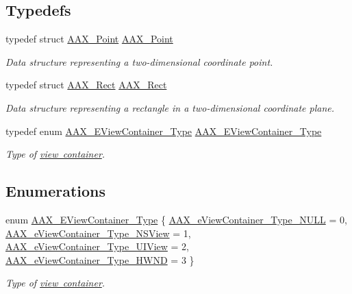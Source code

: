 \subsection*{Typedefs}
\begin{DoxyCompactItemize}
\item 
typedef struct \mbox{\hyperlink{a01609}{A\+A\+X\+\_\+\+Point}} \mbox{\hyperlink{a00503_aace06b5ca898ac66c68fe5f5c598f0b6}{A\+A\+X\+\_\+\+Point}}
\begin{DoxyCompactList}\small\item\em Data structure representing a two-\/dimensional coordinate point. \end{DoxyCompactList}\item 
typedef struct \mbox{\hyperlink{a01613}{A\+A\+X\+\_\+\+Rect}} \mbox{\hyperlink{a00503_a85ca9d563f37484d29b66a2e4ec6598f}{A\+A\+X\+\_\+\+Rect}}
\begin{DoxyCompactList}\small\item\em Data structure representing a rectangle in a two-\/dimensional coordinate plane. \end{DoxyCompactList}\item 
typedef enum \mbox{\hyperlink{a00503_a89d5cb8c7fdb11f34e695fb0e057b764}{A\+A\+X\+\_\+\+E\+View\+Container\+\_\+\+Type}} \mbox{\hyperlink{a00503_ab4c36de253fc80b541eb51074c64caef}{A\+A\+X\+\_\+\+E\+View\+Container\+\_\+\+Type}}
\begin{DoxyCompactList}\small\item\em Type of \mbox{\hyperlink{a01889}{view container}}. \end{DoxyCompactList}\end{DoxyCompactItemize}
\subsection*{Enumerations}
\begin{DoxyCompactItemize}
\item 
enum \mbox{\hyperlink{a00503_a89d5cb8c7fdb11f34e695fb0e057b764}{A\+A\+X\+\_\+\+E\+View\+Container\+\_\+\+Type}} \{ \mbox{\hyperlink{a00503_a89d5cb8c7fdb11f34e695fb0e057b764adf9ab6d93d9a35fcab5f7a0d24a2c308}{A\+A\+X\+\_\+e\+View\+Container\+\_\+\+Type\+\_\+\+N\+U\+LL}} = 0, 
\mbox{\hyperlink{a00503_a89d5cb8c7fdb11f34e695fb0e057b764a7be25786681e17b1a30c62579ab8591a}{A\+A\+X\+\_\+e\+View\+Container\+\_\+\+Type\+\_\+\+N\+S\+View}} = 1, 
\mbox{\hyperlink{a00503_a89d5cb8c7fdb11f34e695fb0e057b764aaabb8401d78697a273fe3983c3f23160}{A\+A\+X\+\_\+e\+View\+Container\+\_\+\+Type\+\_\+\+U\+I\+View}} = 2, 
\mbox{\hyperlink{a00503_a89d5cb8c7fdb11f34e695fb0e057b764a98a127ce6e567cb18c07ac347bb09255}{A\+A\+X\+\_\+e\+View\+Container\+\_\+\+Type\+\_\+\+H\+W\+ND}} = 3
 \}
\begin{DoxyCompactList}\small\item\em Type of \mbox{\hyperlink{a01889}{view container}}. \end{DoxyCompactList}\end{DoxyCompactItemize}
